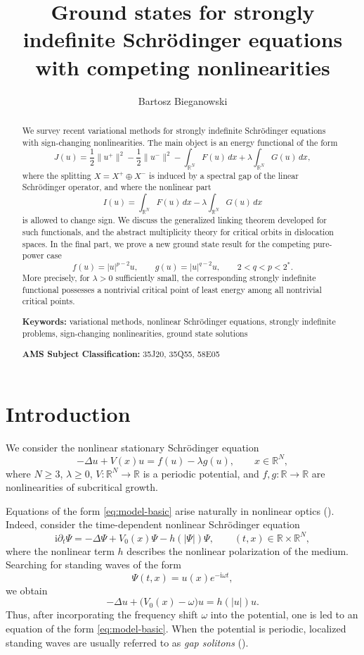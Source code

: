 \documentclass[11pt]{amsart}
\title[Strongly indefinite Schrödinger equations]
{Ground states for strongly indefinite Schr\"{o}dinger equations with competing nonlinearities}
\author[B. Bieganowski]{Bartosz Bieganowski}
\date{}
\numberwithin{equation}{section}
\theoremstyle{definition}
\newcommand{\R}{\mathbb{R}}
\begin{document}
\begin{abstract}
We survey recent variational methods for strongly indefinite Schrödinger
equations with sign-changing nonlinearities. The main object is an energy
functional of the form
\[
J(u)=\frac12\|u^+\|^2-\frac12\|u^-\|^2
-\int_{\R^N}F(u)\,dx+\lambda\int_{\R^N}G(u)\,dx,
\]
where the splitting $X=X^+\oplus X^-$ is induced by a spectral gap of the
linear Schrödinger operator, and where the nonlinear part
\[
I(u)=\int_{\R^N}F(u)\,dx-\lambda\int_{\R^N}G(u)\,dx
\]
is allowed to change sign. We discuss the generalized linking theorem
developed for such functionals, and the abstract multiplicity theory for critical orbits in dislocation spaces. In the final part, we prove a new ground state result for the competing pure-power case
\[
f(u)=|u|^{p-2}u,\qquad g(u)=|u|^{q-2}u,\qquad 2<q<p<2^*.
\]
More precisely, for $\lambda>0$ sufficiently small, the corresponding
strongly indefinite functional possesses a nontrivial critical point of
least energy among all nontrivial critical points. 

\medskip

\noindent \textbf{Keywords:} variational methods, nonlinear Schr\"odinger equations, strongly indefinite problems, sign-changing nonlinearities, ground state solutions
   
\noindent \textbf{AMS Subject Classification:} 35J20, 35Q55, 58E05 

\end{abstract}

\maketitle

\section{Introduction}

We consider the nonlinear stationary Schr\"odinger equation
\begin{equation}\label{eq:model-basic}
-\Delta u + V(x)u = f(u)-\lambda g(u),
\qquad x\in \mathbb{R}^N,
\end{equation}
where $N \geq 3$, $\lambda\geq 0$, $V:\mathbb{R}^N\to\mathbb{R}$ is a periodic
potential, and $f,g:\mathbb{R}\to\mathbb{R}$ are nonlinearities of
subcritical growth.

Equations of the form \eqref{eq:model-basic} arise naturally in nonlinear
optics (\cite{Kuchment, Pankov}). Indeed, consider the time-dependent nonlinear Schr\"odinger
equation
\begin{equation}
\mathrm{i}\partial_t\Psi
=
-\Delta\Psi+V_0(x)\Psi-h(|\Psi|)\Psi,
\qquad (t,x)\in \mathbb{R}\times\mathbb{R}^N,
\end{equation}
where the nonlinear term $h$ describes the nonlinear polarization of the medium. Searching for standing
waves of the form
\[
\Psi(t,x)=u(x)e^{-\mathrm{i}\omega t},
\]
we obtain
\[
-\Delta u+\bigl(V_0(x)-\omega\bigr)u=h(|u|)u.
\]
Thus, after incorporating the frequency shift $\omega$ into the potential,
one is led to an equation of the form \eqref{eq:model-basic}. When the
potential is periodic, localized standing waves are usually referred to as
\emph{gap solitons} (\cite{Buryak}).
\end{document}
